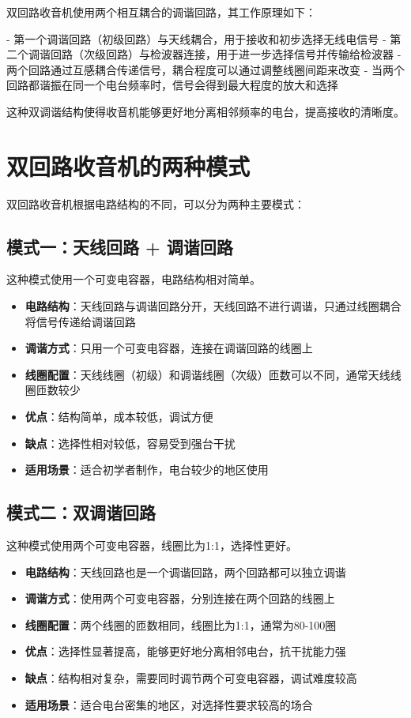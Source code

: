 \documentclass[12pt,UTF8]{ctexbook}
\begin{document}
双回路收音机使用两个相互耦合的调谐回路，其工作原理如下：

- 第一个调谐回路（初级回路）与天线耦合，用于接收和初步选择无线电信号
- 第二个调谐回路（次级回路）与检波器连接，用于进一步选择信号并传输给检波器
- 两个回路通过互感耦合传递信号，耦合程度可以通过调整线圈间距来改变
- 当两个回路都谐振在同一个电台频率时，信号会得到最大程度的放大和选择

这种双调谐结构使得收音机能够更好地分离相邻频率的电台，提高接收的清晰度。

\section{双回路收音机的两种模式}

双回路收音机根据电路结构的不同，可以分为两种主要模式：

\subsection{模式一：天线回路 + 调谐回路}

这种模式使用一个可变电容器，电路结构相对简单。

\begin{itemize}[leftmargin=3.5em]
\item \textbf{电路结构}：天线回路与调谐回路分开，天线回路不进行调谐，只通过线圈耦合将信号传递给调谐回路
\item \textbf{调谐方式}：只用一个可变电容器，连接在调谐回路的线圈上
\item \textbf{线圈配置}：天线线圈（初级）和调谐线圈（次级）匝数可以不同，通常天线线圈匝数较少
\item \textbf{优点}：结构简单，成本较低，调试方便
\item \textbf{缺点}：选择性相对较低，容易受到强台干扰
\item \textbf{适用场景}：适合初学者制作，电台较少的地区使用
\end{itemize}

\subsection{模式二：双调谐回路}

这种模式使用两个可变电容器，线圈比为1:1，选择性更好。

\begin{itemize}[leftmargin=3.5em]
\item \textbf{电路结构}：天线回路也是一个调谐回路，两个回路都可以独立调谐
\item \textbf{调谐方式}：使用两个可变电容器，分别连接在两个回路的线圈上
\item \textbf{线圈配置}：两个线圈的匝数相同，线圈比为1:1，通常为80-100圈
\item \textbf{优点}：选择性显著提高，能够更好地分离相邻电台，抗干扰能力强
\item \textbf{缺点}：结构相对复杂，需要同时调节两个可变电容器，调试难度较高
\item \textbf{适用场景}：适合电台密集的地区，对选择性要求较高的场合
\end{itemize}
\end{document}
